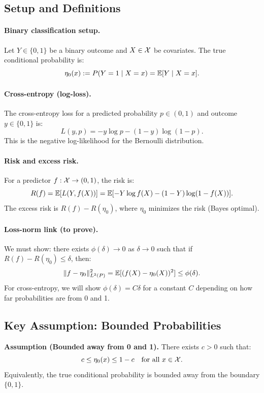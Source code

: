 \documentclass[12pt]{article}
\begin{document}
\subsection{Setup and Definitions}

\paragraph{Binary classification setup.}
Let $Y \in \{0,1\}$ be a binary outcome and $X \in \mathcal{X}$ be covariates. The true conditional probability is:
\[
\eta_0(x) := P(Y = 1 \mid X = x) = \mathbb{E}[Y \mid X = x].
\]

\paragraph{Cross-entropy (log-loss).}
The cross-entropy loss for a predicted probability $p \in (0,1)$ and outcome $y \in \{0,1\}$ is:
\[
L(y, p) = -y \log p - (1-y) \log(1-p).
\]
This is the negative log-likelihood for the Bernoulli distribution.

\paragraph{Risk and excess risk.}
For a predictor $f: \mathcal{X} \to (0,1)$, the risk is:
\[
R(f) = \mathbb{E}[L(Y, f(X))] = \mathbb{E}[-Y \log f(X) - (1-Y) \log(1-f(X))].
\]
The excess risk is $R(f) - R(\eta_0)$, where $\eta_0$ minimizes the risk (Bayes optimal).

\paragraph{Loss-norm link (to prove).}
We must show: there exists $\phi(\delta) \to 0$ as $\delta \to 0$ such that if $R(f) - R(\eta_0) \le \delta$, then:
\[
\|f - \eta_0\|_{L^2(P)}^2 = \mathbb{E}[(f(X) - \eta_0(X))^2] \le \phi(\delta).
\]
For cross-entropy, we will show $\phi(\delta) = C\delta$ for a constant $C$ depending on how far probabilities are from 0 and 1.

\subsection{Key Assumption: Bounded Probabilities}

\textbf{Assumption (Bounded away from 0 and 1).}
\label{assump:bounded-probs}
There exists $c > 0$ such that:
\[
c \le \eta_0(x) \le 1-c \quad \text{for all } x \in \mathcal{X}.
\]
Equivalently, the true conditional probability is bounded away from the boundary $\{0, 1\}$.
\end{document}
